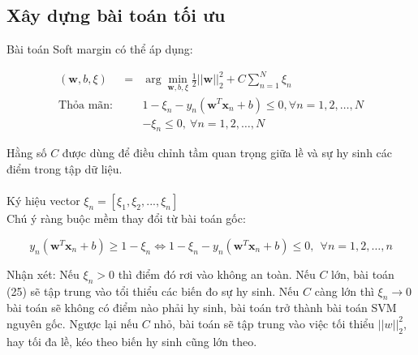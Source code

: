 \documentclass[a4paper, 12pt, oneside]{report}
\begin{document}
\subsection{Xây dựng bài toán tối ưu} 
Bài toán Soft margin có thể áp dụng: 
\begin{mybox}
\begin{eqnarray}
    (\mathbf{w}, b, \xi) &=& \arg \min_{\mathbf{w}, b, \xi} \frac{1}{2}{||\mathbf{w}||_2^2} + C \sum_{n=1}^N \xi_n  \\
    \text{Thỏa mãn:}~ && 1 - \xi_n - y_n(\mathbf{w}^T\mathbf{x}_n + b) \leq 0, \forall n = 1, 2, \dots, N \\
    && -\xi_n \leq 0,  ~\forall n = 1, 2, \dots, N
\end{eqnarray}
\end{mybox}
Hằng số $C$ được dùng để điều chỉnh tầm quan trọng giữa lề và sự hy sinh các điểm trong tập dữ liệu.\\ \\
Ký hiệu vector $\xi_n = [\xi_1,\xi_2,...,\xi_n]$\\
Chú ý ràng buộc mềm thay đổi từ bài toán gốc:
\begin{mybox}
$$y_n(\mathbf{w}^T\mathbf{x}_n + b) \geq 1 - \xi_n \Leftrightarrow 1 - \xi_n - y_n(\mathbf{w}^T\mathbf{x}_n + b) \leq 0, ~~ \forall n = 1, 2, \dots, n$$
\end{mybox}
Nhận xét: Nếu $\xi_n >0$ thì điểm đó rơi vào không an toàn. Nếu $C$ lớn, bài toán (25) sẽ tập trung vào tổi thiểu các biến đo sự hy sinh. Nếu $C$ càng lớn thì $\xi_n \rightarrow 0$ bài toán sẽ không có điểm nào phải hy sinh, bài toán trở thành bài toán SVM nguyên gốc. Ngược lại nếu $C$ nhỏ, bài toán sẽ tập trung vào việc tối thiểu $||w||_2^2$, hay tối đa lề, kéo theo biến hy sinh cũng lớn theo. 
\end{document}
